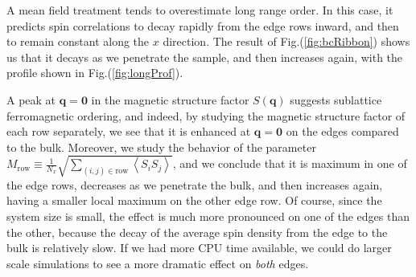 A mean field treatment tends to overestimate long range order.
In this case, it predicts spin correlations to decay rapidly from the edge rows inward, and then to remain constant along the $x$ direction.
The result of Fig.(\ref{fig:bcRibbon}) shows us that it decays as we penetrate the sample, and then increases again, with the profile shown in Fig.(\ref{fig:longProf}).

A peak at $\bm q = \bm 0$ in the magnetic structure factor $S ( \bm q )$ suggests sublattice ferromagnetic ordering, and indeed, by studying the magnetic structure factor of each row separately, we see that it is enhanced at $\bm q = \bm 0$ on the edges compared to the bulk.
Moreover, we study the behavior of the parameter $M_{\text{row}} \equiv \frac{1}{N_x}\sqrt{ \sum_{(i, j) \in \text{row}} \left\langle S_i S_j \right\rangle}$, and we conclude that it is maximum in one of the edge rows, decreases as we penetrate the bulk, and then increases again, having a smaller local maximum on the other edge row.
Of course, since the system size is small, the effect is much more pronounced on one of the edges than the other, because the decay of the average spin density from the edge to the bulk is relatively slow.
If we had more CPU time available, we could do larger scale simulations to see a more dramatic effect on \emph{both} edges.


